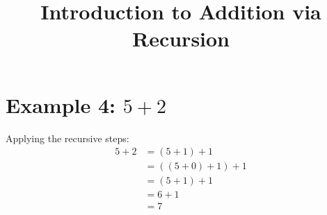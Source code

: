 \documentclass{article}
\title{Introduction to Addition via Recursion}
\author{}
\date{}
\begin{document}
\section{Example 4: \( 5 + 2 \)}
Applying the recursive steps:
\[
    \begin{aligned}
        5 + 2 & = (5 + 1) + 1       \\
              & = ((5 + 0) + 1) + 1 \\
              & = (5 + 1) + 1       \\
              & = 6 + 1             \\
              & = 7
    \end{aligned}
\]
\end{document}
